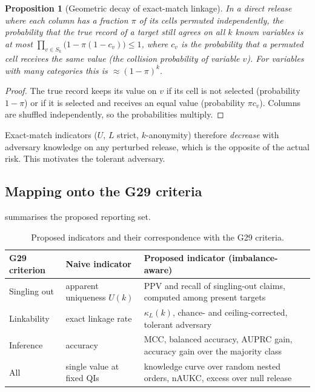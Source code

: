 \documentclass[preprint,12pt]{elsarticle}
\newtheorem{proposition}{Proposition}
\newcommand{\kL}{\kappa_{L}}
\newcommand{\G}{G29}
\begin{document}
\begin{proposition}[Geometric decay of exact-match linkage]
\label{prop:exact}
In a direct release where each column has a fraction $\pi$ of its cells permuted independently, the probability that the true record of a target still agrees on all $k$ known variables is at most $\prod_{v\in S_k}\bigl(1-\pi(1-c_v)\bigr)\le 1$, where $c_v$ is the probability that a permuted cell receives the same value (the collision probability of variable $v$). For variables with many categories this is $\approx(1-\pi)^k$.
\end{proposition}
\begin{proof}
The true record keeps its value on $v$ if its cell is not selected (probability $1-\pi$) or if it is selected and receives an equal value (probability $\pi c_v$). Columns are shuffled independently, so the probabilities multiply.
\end{proof}
Exact-match indicators ($U$, $L$ strict, $k$-anonymity) therefore \emph{decrease} with adversary knowledge on any perturbed release, which is the opposite of the actual risk. This motivates the tolerant adversary.

\subsection{Mapping onto the \G{} criteria}
 summarises the proposed reporting set.

\begin{table}[t]
\centering\small
\caption{Proposed indicators and their correspondence with the \G{} criteria.}
\label{tab:mapping}
\begin{tabular}{@{}p{2.4cm}p{3.6cm}p{6.2cm}@{}}
\toprule
\G{} criterion & Naive indicator & Proposed indicator (imbalance-aware) \\
\midrule
Singling out & apparent uniqueness $U(k)$ & PPV and recall of singling-out claims, computed among present targets \\
Linkability  & exact linkage rate & $\kL(k)$, chance- and ceiling-corrected, tolerant adversary \\
Inference    & accuracy & MCC, balanced accuracy, AUPRC gain, accuracy gain over the majority class \\
All          & single value at fixed QIs & knowledge curve over random nested orders, nAUKC, excess over null release \\
\bottomrule
\end{tabular}
\end{table}
\end{document}
